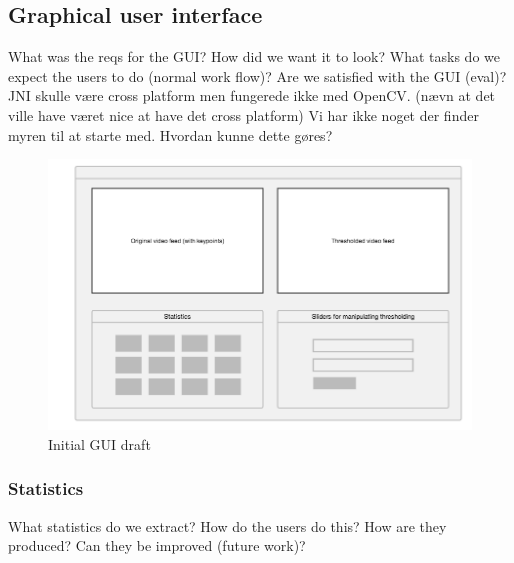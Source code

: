 
\subsection{Graphical user interface}

What was the reqs for the GUI?
How did we want it to look?
What tasks do we expect the users to do (normal work flow)?
Are we satisfied with the GUI (eval)?
JNI skulle være cross platform men fungerede ikke med OpenCV.
(nævn at det ville have været nice at have det cross platform)
Vi har ikke noget der finder myren til at starte med. Hvordan kunne dette gøres?

\begin{figure}[!ht]
    \centering
    \includegraphics[scale = 0.3]{img/termes_gui.png}
    \caption{Initial GUI draft}
\end{figure}

\subsubsection{Statistics} \mbox{}\par
What statistics do we extract?
How do the users do this?
How are they produced?
Can they be improved (future work)?
